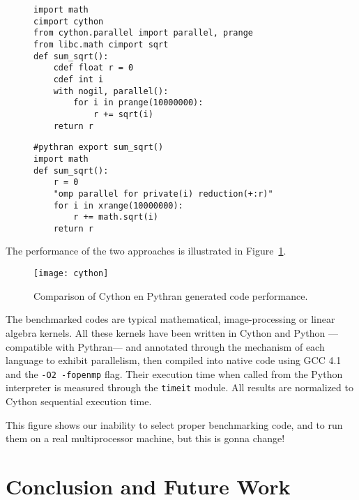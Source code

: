 \documentclass{llncs}
\begin{document}
\begin{figure}[ht]

    \begin{lstlisting}[label={lst:cython-sample}, caption={Cython Impelmentation
    of a Parallel Reduction.}]
import math
cimport cython
from cython.parallel import parallel, prange
from libc.math cimport sqrt
def sum_sqrt():
    cdef float r = 0
    cdef int i
    with nogil, parallel():
        for i in prange(10000000):
            r += sqrt(i)
    return r
\end{lstlisting}
\end{figure}
%
\begin{figure}[ht]
    \begin{lstlisting}[label={lst:pythran-sample}, caption={Cython Impelmentation
    of a Parallel Reduction.}]
#pythran export sum_sqrt()
import math
def sum_sqrt():
    r = 0
    "omp parallel for private(i) reduction(+:r)"
    for i in xrange(10000000):
        r += math.sqrt(i)
    return r
    \end{lstlisting}
\end{figure}



The performance of the two approaches is illustrated in
Figure~\ref{fig:cython-pythran}.

\begin{figure}[ht]
    \texttt{[image: cython]}
    \caption{Comparison of Cython en Pythran generated code performance.}
    \label{fig:cython-pythran}
\end{figure}

The benchmarked codes are typical mathematical, image-processing or linear
algebra kernels. All these kernels have been written in Cython and Python
---compatible with Pythran--- and annotated through the mechanism of each
language to exhibit parallelism, then compiled into native code using GCC 4.1
and the \texttt{-O2 -fopenmp} flag. Their execution time when called from the
Python interpreter is measured through the \texttt{timeit} module. All results
are normalized to Cython sequential execution time.

This figure shows our inability to select proper benchmarking code, and to run
them on a real multiprocessor machine, but this is gonna change!~


\section{Conclusion and Future Work}
\end{document}

